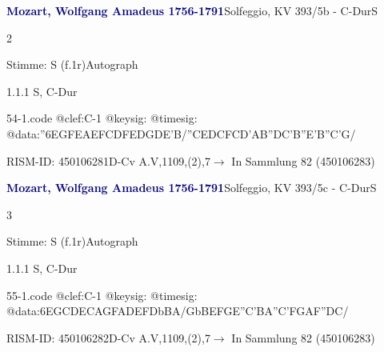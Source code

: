 \documentclass[a4paper, twocolumn, 11pt]{book}
\begin{document}
\par \vspace{16pt} \textcolor{darkblue}{\textbf{Mozart, Wolfgang Amadeus  1756-1791}}\hfillplus{[54]}\newline Solfeggio, KV 393/5b - C-Dur\newline S
\par \begin{itshape} 2\end{itshape} 
\par \textcolor{darkblue}{}  Stimme: S  (f.1r)\newline Autograph
\par 1.1.1  S, C-Dur  
\begin{filecontents*}{54-1.code}
@clef:C-1
@keysig:
@timesig:
@data:''{6EGFE}{AEFC}{DFED}{GDE'B}/''{CEDC}{FCD'A}{B''DC'B}{''E'B''C'G}/
\end{filecontents*}
\newline %
\par RISM-ID: 450106281\newline D-Cv  A.V,1109,(2),7\newline $\rightarrow$ In Sammlung 82 (450106283)
      
\par \vspace{16pt} \textcolor{darkblue}{\textbf{Mozart, Wolfgang Amadeus  1756-1791}}\hfillplus{[55]}\newline Solfeggio, KV 393/5c - C-Dur\newline S
\par \begin{itshape} 3\end{itshape} 
\par \textcolor{darkblue}{}  Stimme: S  (f.1r)\newline Autograph
\par 1.1.1  S, C-Dur  
\begin{filecontents*}{55-1.code}
@clef:C-1
@keysig:
@timesig:
@data:{6EGCD}{ECAG}{FADE}{FDbBA}/{GbBEF}{GE''C'B}{A''C'FG}{AF''DC}/
\end{filecontents*}
\newline %
\par RISM-ID: 450106282\newline D-Cv  A.V,1109,(2),7\newline $\rightarrow$ In Sammlung 82 (450106283)
      
\end{document}
